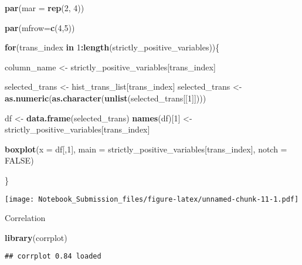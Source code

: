 \documentclass[
]{article}
\newenvironment{Shaded}{\begin{snugshade}}{\end{snugshade}}
\newcommand{\ControlFlowTok}[1]{\textcolor[rgb]{0.13,0.29,0.53}{\textbf{#1}}}
\newcommand{\DataTypeTok}[1]{\textcolor[rgb]{0.13,0.29,0.53}{#1}}
\newcommand{\DecValTok}[1]{\textcolor[rgb]{0.00,0.00,0.81}{#1}}
\newcommand{\KeywordTok}[1]{\textcolor[rgb]{0.13,0.29,0.53}{\textbf{#1}}}
\newcommand{\NormalTok}[1]{#1}
\newcommand{\OperatorTok}[1]{\textcolor[rgb]{0.81,0.36,0.00}{\textbf{#1}}}
\newcommand{\OtherTok}[1]{\textcolor[rgb]{0.56,0.35,0.01}{#1}}
\newcommand{\StringTok}[1]{\textcolor[rgb]{0.31,0.60,0.02}{#1}}
\begin{document}
\begin{Shaded}
\begin{Highlighting}[]
\KeywordTok{par}\NormalTok{(}\DataTypeTok{mar =} \KeywordTok{rep}\NormalTok{(}\DecValTok{2}\NormalTok{, }\DecValTok{4}\NormalTok{))}

\KeywordTok{par}\NormalTok{(}\DataTypeTok{mfrow=}\KeywordTok{c}\NormalTok{(}\DecValTok{4}\NormalTok{,}\DecValTok{5}\NormalTok{))}

\ControlFlowTok{for}\NormalTok{(trans_index }\ControlFlowTok{in} \DecValTok{1}\OperatorTok{:}\KeywordTok{length}\NormalTok{(strictly_positive_variables))\{}
  
  
\NormalTok{  column_name <-}\StringTok{ }\NormalTok{strictly_positive_variables[trans_index]}
  
\NormalTok{  selected_trans <-}\StringTok{ }\NormalTok{hist_trans_list[trans_index]}
\NormalTok{  selected_trans <-}\StringTok{ }\KeywordTok{as.numeric}\NormalTok{(}\KeywordTok{as.character}\NormalTok{(}\KeywordTok{unlist}\NormalTok{(selected_trans[[}\DecValTok{1}\NormalTok{]])))}
  
\NormalTok{  df <-}\StringTok{ }\KeywordTok{data.frame}\NormalTok{(selected_trans)}
  \KeywordTok{names}\NormalTok{(df)[}\DecValTok{1}\NormalTok{] <-}\StringTok{ }\NormalTok{strictly_positive_variables[trans_index]}
  
  \KeywordTok{boxplot}\NormalTok{(}\DataTypeTok{x =}\NormalTok{ df[,}\DecValTok{1}\NormalTok{], }\DataTypeTok{main =}\NormalTok{ strictly_positive_variables[trans_index], }\DataTypeTok{notch =} \OtherTok{FALSE}\NormalTok{)}
  
\NormalTok{\}}
\end{Highlighting}
\end{Shaded}

\texttt{[image: Notebook\_Submission\_files/figure-latex/unnamed-chunk-11-1.pdf]}

Correlation

\begin{Shaded}
\begin{Highlighting}[]
\KeywordTok{library}\NormalTok{(corrplot)}
\end{Highlighting}
\end{Shaded}

\begin{verbatim}
## corrplot 0.84 loaded
\end{verbatim}
\end{document}
